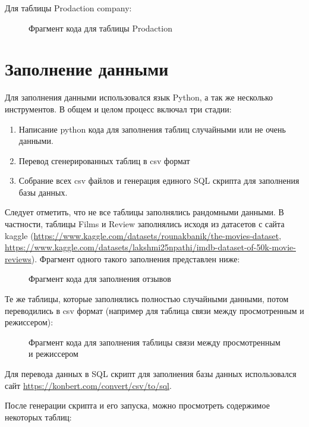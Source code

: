  Для таблицы Prodaction company:
\begin{figure} [H]
    \caption{Фрагмент кода для таблицы Prodaction}
\end{figure}

\section{Заполнение данными}
Для заполнения данными использовался язык Python, а так же несколько инструментов. В общем и целом процесс
включал три стадии:

\begin{enumerate}
\item Написание python кода для заполнения таблиц случайными или не очень данными.
\item Перевод сгенерированных таблиц в csv формат
\item Собрание всех csv файлов и генерация единого SQL скрипта для заполнения базы данных.
\end{enumerate}

Следует отметить, что не все таблицы заполнялись рандомными данными. В частности, таблицы Films и
Review заполнялись исходя из датасетов с сайта kaggle (\url{https://www.kaggle.com/datasets/rounakbanik/the-movies-dataset},
\url{https://www.kaggle.com/datasets/lakshmi25npathi/imdb-dataset-of-50k-movie-reviews}). Фрагмент одного
такого заполнения представлен ниже:

\begin{figure} [H]
    \caption{Фрагмент кода для заполнения отзывов}
\end{figure}

Те же таблицы, которые заполнялись полностью случайными данными, потом переводились в csv формат
(например для таблица связи между просмотренным и режиссером):
\begin{figure} [H]
    \caption{Фрагмент кода для заполнения таблицы связи между просмотренным и режиссером}
\end{figure}

Для перевода данных в SQL скрипт для заполнения базы данных использовался сайт \url{https://konbert.com/convert/csv/to/sql}.

После генерации скрипта и его запуска, можно просмотреть содержимое некоторых таблиц:

